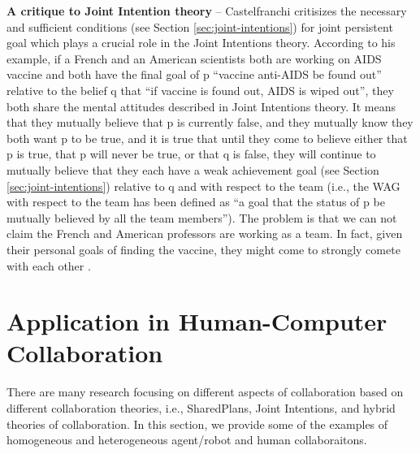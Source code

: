 \documentclass[11pt]{article}
\begin{document}
\textbf{A critique to Joint Intention theory} -- Castelfranchi critisizes the
necessary and sufficient conditions (see Section \ref{sec:joint-intentions}) for
joint persistent goal which plays a crucial role in the Joint Intentions theory.
According to his example, if a French and an American scientists both are
working on AIDS vaccine and both have the final goal of p ``vaccine anti-AIDS be
found out'' relative to the belief q that ``if vaccine is found out, AIDS is
wiped out'', they both share the mental attitudes described in Joint Intentions
theory. It means that they mutually believe that p is currently false, and they
mutually know they both want p to be true, and it is true that until they come
to believe either that p is true, that p will never be true, or that q is false,
they will continue to mutually believe that they each have a weak achievement
goal (see Section \ref{sec:joint-intentions}) relative to q and with respect to
the team (i.e., the WAG with respect to the team has been defined as ``a goal
that the status of p be mutually  believed by all the team members''). The
problem is that we can not claim the French and American professors are working
as a team. In fact, given their personal goals of finding the vaccine, they
might come to strongly comete with each other
\cite{castelfranchi:commitments-aids}.

\section{Application in Human-Computer Collaboration}
\label{sec:applicaiton}

There are many research focusing on different aspects of collaboration based on
different collaboration theories, i.e., SharedPlans, Joint Intentions, and
hybrid theories of collaboration. In this section, we provide some of the examples
of homogeneous and heterogeneous agent/robot and human collaboraitons.
\end{document}
